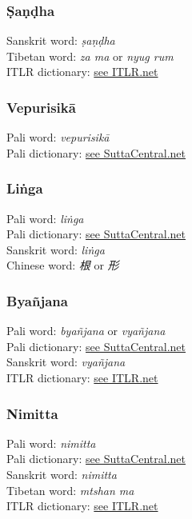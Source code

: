 \begin{multicols}{2}
\subsubsection*{Ṣaṇḍha}
Sanskrit word: \textit{ṣaṇḍha}\\
Tibetan word: \textit{za ma} or \textit{nyug rum}\\
ITLR dictionary: \href{https://www.itlr.net/hwid:281142?md=view&m2=op1&usid=281142}{see ITLR.net}
\vfill\null
\columnbreak

\subsubsection*{Vepurisikā}
Pali word: \textit{vepurisikā}\\
Pali dictionary: \href{https://suttacentral.net/define/vepurisik%C4%81}{see SuttaCentral.net}

\subsubsection*{Liṅga}
Pali word: \textit{liṅga}\\
Pali dictionary: \href{https://suttacentral.net/define/li%E1%B9%85ga}{see SuttaCentral.net}\\
Sanskrit word: \textit{liṅga}\\
Chinese word: \textit{根} or \textit{形}

\subsubsection*{Byañ­jana}
Pali word: \textit{b­yañ­jana} or \textit{vyañjana}\\
Pali dictionary: \href{https://suttacentral.net/define/li%E1%B9%85ga}{see SuttaCentral.net}\\
Sanskrit word: \textit{vyañjana}\\
ITLR dictionary: \href{https://www.itlr.net/hwid:281142?md=view&m2=op1&usid=281142}{see ITLR.net}

\subsubsection*{Nimitta}
Pali word: \textit{nimitta}\\
Pali dictionary: \href{https://suttacentral.net/define/nimitta}{see SuttaCentral.net}\\
Sanskrit word: \textit{nimitta}\\
Tibetan word: \textit{mtshan ma}\\
ITLR dictionary: \href{https://www.itlr.net/hwid:281142?md=view&m2=op1&usid=281142}{see ITLR.net}
\end{multicols}

